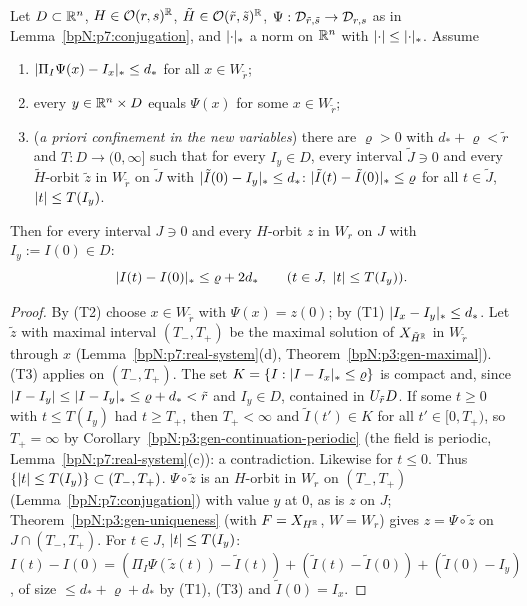 \begin{lemma}\label{bpN:p7:transfer}
Let $D\subset\mathbb{R}^n$, $H\in\mathcal O(r,s)^{\mathbb{R}}$, $\tilde H\in\mathcal O(\tilde r,\tilde s)^{\mathbb{R}}$, $\Psi:\mathcal D_{\tilde r,\tilde s}\to\mathcal D_{r,s}$ as in Lemma~\ref{bpN:p7:conjugation}, and $\lvert \cdot\rvert_*$ a norm on $\mathbb{R}^n$ with $\lvert \cdot\rvert\le\lvert \cdot\rvert_*$. Assume
\begin{enumerate}[label=(T\arabic*)]
\item $\lvert \Pi_I\Psi(x)-I_x\rvert_*\le d_*$ for all $x\in W_{\tilde r}$;
\item every $y\in\mathbb{R}^n\times D$ equals $\Psi(x)$ for some $x\in W_{\tilde r}$;
\item (\emph{a priori confinement in the new variables}) there are $\varrho>0$ with $d_*+\varrho<\tilde r$ and $T:D\to(0,\infty]$ such that for every $I_y\in D$, every interval $\tilde J\ni0$ and every $\tilde H$-orbit $\tilde z$ in $W_{\tilde r}$ on $\tilde J$ with $\lvert \tilde I(0)-I_y\rvert_*\le d_*$: $\lvert \tilde I(t)-\tilde I(0)\rvert_*\le\varrho$ for all $t\in\tilde J$, $\lvert t\rvert\le T(I_y)$.
\end{enumerate}
Then for every interval $J\ni0$ and every $H$-orbit $z$ in $W_r$ on $J$ with $I_y:=I(0)\in D$:
\[\lvert I(t)-I(0)\rvert_*\le\varrho+2d_*\qquad(t\in J,\ \lvert t\rvert\le T(I_y)).\]
\end{lemma}
\begin{proof}
\label{stepN:p7:tr-orbit} By (T2) choose $x\in W_{\tilde r}$ with $\Psi(x)=z(0)$; by (T1) $\lvert I_x-I_y\rvert_*\le d_*$. Let $\tilde z$ with maximal interval $(T_-,T_+)$ be the maximal solution of $X_{\tilde H^{\mathbb{R}}}$ in $W_{\tilde r}$ through $x$ (Lemma~\ref{bpN:p7:real-system}(d), Theorem~\ref{bpN:p3:gen-maximal}).
\label{stepN:p7:tr-long} (T3) applies on $(T_-,T_+)$. The set $K=\{I:\lvert I-I_x\rvert_*\le\varrho\}$ is compact and, since $\lvert I-I_y\rvert\le\lvert I-I_y\rvert_*\le\varrho+d_*<\tilde r$ and $I_y\in D$, contained in $U_{\tilde r}D$. If some $t\ge0$ with $t\le T(I_y)$ had $t\ge T_+$, then $T_+<\infty$ and $\tilde I(t')\in K$ for all $t'\in[0,T_+)$, so $T_+=\infty$ by Corollary~\ref{bpN:p3:gen-continuation-periodic} (the field is periodic, Lemma~\ref{bpN:p7:real-system}(c)): a contradiction. Likewise for $t\le0$. Thus $\{\lvert t\rvert\le T(I_y)\}\subset(T_-,T_+)$.
\label{stepN:p7:tr-ident} $\Psi\circ\tilde z$ is an $H$-orbit in $W_r$ on $(T_-,T_+)$ (Lemma~\ref{bpN:p7:conjugation}) with value $y$ at $0$, as is $z$ on $J$; Theorem~\ref{bpN:p3:gen-uniqueness} (with $F=X_{H^{\mathbb{R}}}$, $W=W_r$) gives $z=\Psi\circ\tilde z$ on $J\cap(T_-,T_+)$.
\label{stepN:p7:tr-est} For $t\in J$, $\lvert t\rvert\le T(I_y)$: $I(t)-I(0)=(\Pi_I\Psi(\tilde z(t))-\tilde I(t))+(\tilde I(t)-\tilde I(0))+(\tilde I(0)-I_y)$, of size $\le d_*+\varrho+d_*$ by (T1), (T3) and $\tilde I(0)=I_x$.
\end{proof}

